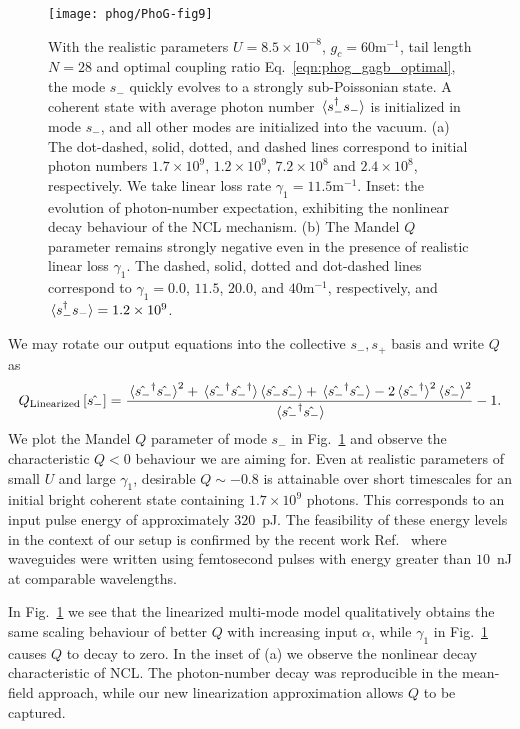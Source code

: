 \begin{figure}[htp]
\captionsetup{width=\linewidth}
\centering
\texttt{[image: phog/PhoG-fig9]}
\caption{\label{fig:phog_multimode_linearized} With the realistic parameters $U = 8.5 \times 10^{-8}$, $g_c = 60$m$^{-1}$, tail length $N = 28$ and optimal coupling ratio Eq.~\ref{eqn:phog_gagb_optimal}, the mode $s_-$ quickly evolves to a strongly sub-Poissonian state. A coherent state with average photon number $\ev*{s_-^\dagger s_-}$ is initialized in mode $s_-$, and all other modes are initialized into the vacuum. (a) The dot-dashed, solid, dotted, and dashed lines correspond to initial photon numbers $1.7\times 10^9$, $1.2\times 10^9$, $7.2\times 10^8$ and $2.4\times 10^8$, respectively. We take linear loss rate $\gamma_1 = 11.5$m$^{-1}$. Inset: the evolution of photon-number expectation, exhibiting the nonlinear decay behaviour of the NCL mechanism. (b) The Mandel $Q$ parameter remains strongly negative even in the presence of realistic linear loss $\gamma_1$. The dashed, solid, dotted and dot-dashed lines correspond to $\gamma_1 = 0.0$, $11.5$, $20.0$, and $40$m$^{-1}$, respectively, and $\ev*{s_-^\dagger s_-} = 1.2\times 10^9$.}
\end{figure}


We may rotate our output equations into the collective $s_-, s_+$ basis and write $Q$ as 
\begin{equation}
Q_{\text{Linearized}}\left[\hat{s_-}\right] = \frac{\ev*{\hat{s_-}^\dagger \hat{s_-}}^2 + \ev*{\hat{s_-}^\dagger\hat{s_-}^\dagger} \ev{\hat{s_-}\hat{s_-}} + \ev*{\hat{s_-}^\dagger \hat{s_-}} - 2 \ev*{\hat{s_-}^\dagger}^2 \ev{\hat{s_-}}^2}{\ev*{\hat{s_-}^\dagger \hat{s_-}}} - 1.
\end{equation}
We plot the Mandel $Q$ parameter of mode $s_-$ in Fig.~\ref{fig:phog_multimode_linearized} and observe the characteristic $Q<0$ behaviour we are aiming for. Even at realistic parameters of small $U$ and large $\gamma_1$, desirable $Q \sim -0.8$ is attainable over short timescales for an initial bright coherent state containing $1.7\times 10^9$ photons. This corresponds to an input pulse energy of approximately $320$~pJ. The feasibility of these energy levels in the context of our setup is confirmed by the recent work Ref.~\cite{Butcher2018} where waveguides were written using femtosecond pulses with energy greater than $10$~nJ at comparable wavelengths.

In Fig.~\ref{fig:phog_multimode_linearized} we see that the linearized multi-mode model qualitatively obtains the same scaling behaviour of better $Q$ with increasing input $\alpha$, while $\gamma_1$ in Fig.~\ref{fig:phog_multimode_linearized} causes $Q$ to decay to zero. In the inset of (a) we observe the nonlinear decay characteristic of NCL. The photon-number decay was reproducible in the mean-field approach, while our new linearization approximation allows $Q$ to be captured.




